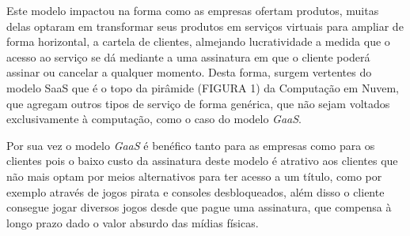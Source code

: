 \begin{justify}
    Este modelo impactou na forma como as empresas ofertam produtos, muitas delas optaram em
    transformar seus produtos em serviços virtuais para ampliar de forma horizontal, a cartela de
    clientes, almejando lucratividade a medida que o acesso ao serviço se dá mediante a uma
    assinatura em que o cliente poderá assinar ou cancelar a qualquer momento.
    Desta forma, surgem vertentes do modelo SaaS que é o topo da pirâmide (FIGURA 1) da Computação
    em Nuvem, que agregam outros tipos de serviço de forma genérica, que não sejam voltados
    exclusivamente à computação, como o caso do modelo \textit{GaaS}.

    Por sua vez o modelo \textit{GaaS} é benéfico tanto para as empresas como para os clientes pois o
    baixo custo da assinatura deste modelo é atrativo aos clientes que não mais optam por meios
    alternativos para ter acesso a um título, como por exemplo através de jogos pirata e consoles
    desbloqueados, além disso o cliente consegue jogar diversos jogos desde que pague uma
    assinatura, que compensa à longo prazo dado o valor absurdo das mídias físicas.


\end{justify}
